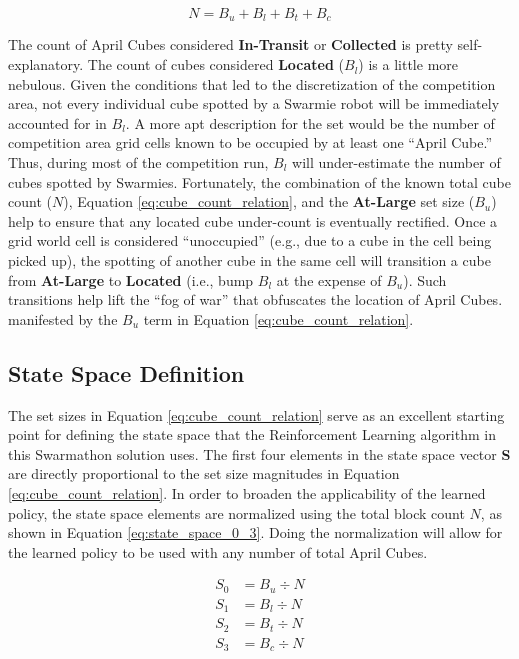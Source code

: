 \documentclass[sigconf,authordraft]{acmart}
\begin{document}
\begin{equation}\label{eq:cube_count_relation}
  N = B_u + B_l + B_t + B_c
\end{equation}

The count of April Cubes considered \textbf{In-Transit} or \textbf{Collected} is pretty self-explanatory. The count of cubes considered \textbf{Located} ($B_l$) is a little more nebulous. Given the conditions that led to the discretization of the competition area, not every individual cube spotted by a Swarmie robot will be immediately accounted for in $B_l$. A more apt description for the set would be the number of competition area grid cells known to be occupied by at least one ``April Cube.'' Thus, during most of the competition run, $B_l$ will under-estimate the number of cubes spotted by Swarmies. Fortunately, the combination of the known total cube count ($N$), Equation \ref{eq:cube_count_relation}, and the \textbf{At-Large} set size ($B_u$) help to ensure that any located cube under-count is eventually rectified. Once a grid world cell is considered ``unoccupied'' (e.g., due to a cube in the cell being picked up), the spotting of another cube in the same cell will transition a cube from \textbf{At-Large} to \textbf{Located} (i.e., bump $B_l$ at the expense of $B_u$). Such transitions help lift the ``fog of war'' that obfuscates the location of April Cubes. manifested by the $B_u$ term in Equation \ref{eq:cube_count_relation}.

\subsection{State Space Definition}\label{subsec:state_space}
The set sizes in Equation \ref{eq:cube_count_relation} serve as an excellent starting point for defining the state space that the Reinforcement Learning algorithm in this Swarmathon solution uses. The first four elements in the state space vector \textbf{S} are directly proportional to the set size magnitudes in Equation \ref{eq:cube_count_relation}. In order to broaden the applicability of the learned policy, the state space elements are normalized using the total block count $N$, as shown in Equation \ref{eq:state_space_0_3}. Doing the normalization will allow for the learned policy to be used with any number of total April Cubes.

\begin{equation}\label{eq:state_space_0_3}
  \begin{aligned}
    S_0 &= B_u \div N \\
    S_1 &= B_l \div N \\
    S_2 &= B_t \div N \\
    S_3 &= B_c \div N
  \end{aligned}
\end{equation}
\end{document}
